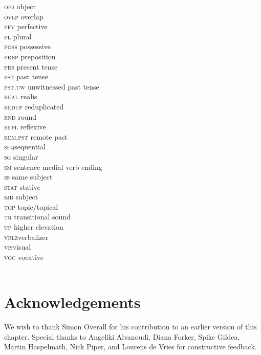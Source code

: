 \documentclass[output=paper]{LSP/langsci}
\begin{document}
\begin{multicols}{2}
\begin{tabbing}
\textsc{obj} \> object \\
\textsc{ovlp} \> overlap \\
\textsc{pfv} \> perfective \\
\textsc{pl} \> plural \\
\textsc{poss} \> possessive \\
\textsc{prep} \> preposition \\
\textsc{prs} \> present tense \\
\textsc{pst} \> past tense \\
\textsc{pst.uw} \> unwitnessed past tense \\
\textsc{real} \> realis \\
\textsc{redup} \> reduplicated \\
\textsc{rnd} \> round \\
\textsc{refl} \> reflexive \\
\textsc{rem.pst} \> remote past \\
\textsc{seq}\>sequential \\
\textsc{sg} \> singular \\
\textsc{sm} \> sentence medial verb ending \\
\textsc{ss} \> same subject \\
\textsc{stat} \> stative \\
\textsc{sjb} \> subject \\
\textsc{top} \> topic\slash topical \\
\textsc{tr} \> transitional sound \\
\textsc{up} \> higher elevation \\
\textsc{vblz}\>verbalizer \\
\textsc{vis}\>visual \\
\textsc{voc} \> vocative\\
 \> \\
\end{tabbing}
\end{multicols}

\section*{Acknowledgements}
We wish to thank Simon Overall for his contribution to an earlier version of this chapter. Special thanks to Angeliki Alvanoudi, Diana Forker, Spike Gildea, Martin Haspelmath, Nick Piper, and Lourens de Vries for constructive feedback. 

\sloppy
\printbibliography[heading=subbibliography,notkeyword=this] 
\end{document}
